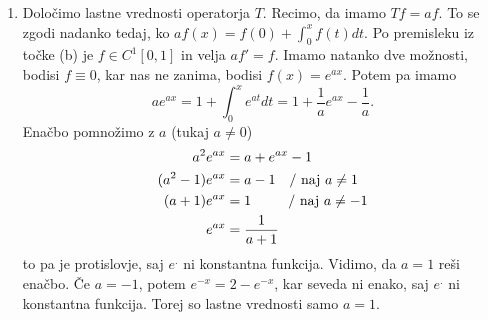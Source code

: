 \documentclass[a4paper, 12pt]{article}
\begin{document}
\begin{enumerate}[label=(\alph*)]
	\item Določimo lastne vrednosti operatorja $T$. Recimo, da imamo $Tf = af$. To se zgodi nadanko tedaj, ko $af(x) = f(0) + \int_{0}^x f(t)dt$. Po premisleku iz točke (b) je $f \in C^1[0,1]$ in velja $af' = f$. Imamo natanko dve možnosti, bodisi $f \equiv 0$, kar nas ne zanima, bodisi $f(x) = e^{ax}$. Potem pa imamo
	\[
	ae^{ax} = 1 + \int_{0}^x e^{at}dt = 1 + \frac{1}{a}e^{ax} - \frac{1}{a}.
	\]
	Enačbo pomnožimo z $a$ (tukaj $a \neq 0$)
	\begin{align*}
	a^2e^{ax} &= a + e^{ax} - 1\\
	(a^2 - 1)e^{ax} &= a - 1 \text{\quad/ naj $a \neq 1$}\\
	(a + 1)e^{ax} &= 1 \text{\ \ \quad\quad/ naj $a \neq -1$}\\
	e^{ax} &= \frac{1}{a + 1}
	\end{align*}
	to pa je protislovje, saj $e^.$ ni konstantna funkcija.
	Vidimo, da $a = 1$ reši enačbo. Če $a = -1$, potem $e^{-x} = 2 - e^{-x}$, kar seveda ni enako, saj $e^.$ ni konstantna funkcija. Torej so lastne vrednosti samo $a = 1$.
\end{enumerate}
\end{document}
